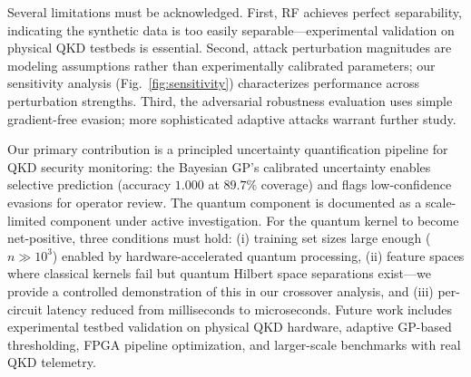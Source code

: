 \documentclass[conference,10pt]{IEEEtran}
\begin{document}
Several limitations must be acknowledged. First, RF achieves perfect separability, indicating the synthetic data is too easily separable---experimental validation on physical QKD testbeds is essential. Second, attack perturbation magnitudes are modeling assumptions rather than experimentally calibrated parameters; our sensitivity analysis (Fig.~\ref{fig:sensitivity}) characterizes performance across perturbation strengths. Third, the adversarial robustness evaluation uses simple gradient-free evasion; more sophisticated adaptive attacks warrant further study.

Our primary contribution is a principled uncertainty quantification pipeline for QKD security monitoring: the Bayesian GP's calibrated uncertainty enables selective prediction (accuracy $1.000$ at $89.7\%$ coverage) and flags low-confidence evasions for operator review. The quantum component is documented as a scale-limited component under active investigation. For the quantum kernel to become net-positive, three conditions must hold: (i) training set sizes large enough ($n \gg 10^3$) enabled by hardware-accelerated quantum processing, (ii) feature spaces where classical kernels fail but quantum Hilbert space separations exist---we provide a controlled demonstration of this in our crossover analysis, and (iii) per-circuit latency reduced from milliseconds to microseconds. Future work includes experimental testbed validation on physical QKD hardware, adaptive GP-based thresholding, FPGA pipeline optimization, and larger-scale benchmarks with real QKD telemetry.
\end{document}
